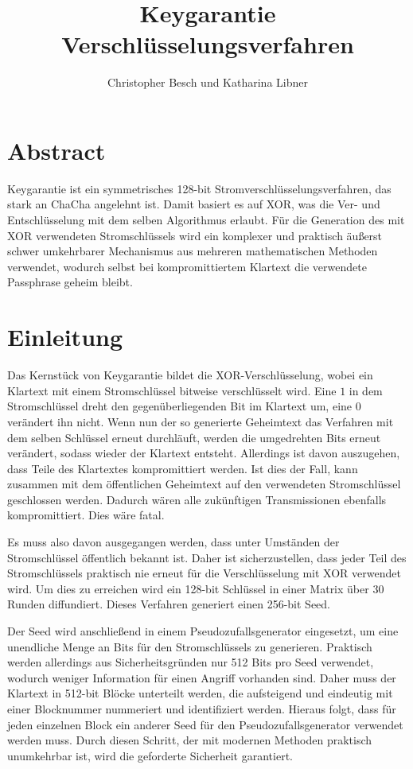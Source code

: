 \documentclass[10pt,a4paper]{article}
\author{Christopher Besch und Katharina Libner}
\title{Keygarantie Verschlüsselungsverfahren}
\begin{document}
\maketitle
\tableofcontents
\newpage

\section{Abstract}

Keygarantie ist ein symmetrisches 128-bit Stromverschlüsselungsverfahren, das stark an ChaCha angelehnt ist\cite{Bernstein2008}.
Damit basiert es auf XOR, was die Ver- und Entschlüsselung mit dem selben Algorithmus erlaubt.
Für die Generation des mit XOR verwendeten Stromschlüssels wird ein komplexer und praktisch äußerst schwer umkehrbarer Mechanismus aus mehreren mathematischen Methoden verwendet, wodurch selbst bei kompromittiertem Klartext die verwendete Passphrase geheim bleibt.

\section{Einleitung}

Das Kernstück von Keygarantie bildet die XOR-Verschlüsselung, wobei ein Klartext mit einem Stromschlüssel bitweise verschlüsselt wird.
Eine $1$ in dem Stromschlüssel dreht den gegenüberliegenden Bit im Klartext um, eine $0$ verändert ihn nicht.
Wenn nun der so generierte Geheimtext das Verfahren mit dem selben Schlüssel erneut durchläuft, werden die umgedrehten Bits erneut verändert, sodass wieder der Klartext entsteht.
Allerdings ist davon auszugehen, dass Teile des Klartextes kompromittiert werden.
Ist dies der Fall, kann zusammen mit dem öffentlichen Geheimtext auf den verwendeten Stromschlüssel geschlossen werden.
Dadurch wären alle zukünftigen Transmissionen ebenfalls kompromittiert.
Dies wäre fatal.

\medskip
Es muss also davon ausgegangen werden, dass unter Umständen der Stromschlüssel öffentlich bekannt ist.
Daher ist sicherzustellen, dass jeder Teil des Stromschlüssels praktisch nie erneut für die Verschlüsselung mit XOR verwendet wird.
Um dies zu erreichen wird ein 128-bit Schlüssel in einer Matrix über 30 Runden diffundiert.
Dieses Verfahren generiert einen 256-bit Seed.

\medskip
Der Seed wird anschließend in einem Pseudozufallsgenerator eingesetzt, um eine unendliche Menge an Bits für den Stromschlüssels zu generieren.
Praktisch werden allerdings aus Sicherheitsgründen nur 512 Bits pro Seed verwendet, wodurch weniger Information für einen Angriff vorhanden sind.
Daher muss der Klartext in 512-bit Blöcke unterteilt werden, die aufsteigend und eindeutig mit einer Blocknummer nummeriert und identifiziert werden.
Hieraus folgt, dass für jeden einzelnen Block ein anderer Seed für den Pseudozufallsgenerator verwendet werden muss.
Durch diesen Schritt, der mit modernen Methoden praktisch unumkehrbar ist, wird die geforderte Sicherheit garantiert.
\end{document}
